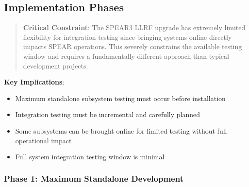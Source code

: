 \subsection{Implementation Phases}\label{implementation-phases}

\begin{quote}
\textbf{Critical Constraint}: The SPEAR3 LLRF upgrade has extremely limited flexibility for integration testing since bringing systems online directly impacts SPEAR operations. This severely constrains the available testing window and requires a fundamentally different approach than typical development projects.
\end{quote}

\textbf{Key Implications}:

\begin{itemize}
\tightlist
\item
  Maximum standalone subsystem testing must occur before installation
\item
  Integration testing must be incremental and carefully planned
\item
  Some subsystems can be brought online for limited testing without full operational impact
\item
  Full system integration testing window is minimal
\end{itemize}

\subsubsection{Phase 1: Maximum Standalone Development}\label{phase-1-maximum-standalone-development}

